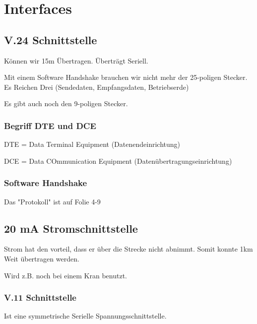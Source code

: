 \documentclass[a4paper]{article}
\title{\docTitle}
\author{Moritz}
\date{\today}
\begin{document}
\maketitle
\tableofcontents


\section{Interfaces}

\subsection{V.24 Schnittstelle}

Können wir 15m Übertragen. Überträgt Seriell.

Mit einem Software Handshake brauchen wir nicht mehr der 25-poligen Stecker. Es Reichen Drei (Sendedaten, Empfangsdaten, Betriebserde)

Es gibt auch noch den 9-poligen Stecker.

\subsubsection*{Begriff DTE und DCE}

DTE = Data Terminal Equipment (Datenendeinrichtung)

DCE = Data COmmunication Equipment (Datenübertragungseinrichtung)

\subsubsection*{Software Handshake}

Das "Protokoll" ist auf Folie 4-9

\subsection{20 mA Stromschnittstelle}

Strom hat den vorteil, dass er über die Strecke nicht abnimmt. Somit konnte 1km Weit übertragen werden.

Wird z.B. noch bei einem Kran benutzt.

\subsubsection{V.11 Schnittstelle}

Ist eine symmetrische Serielle Spannungsschnittstelle.
\end{document}
